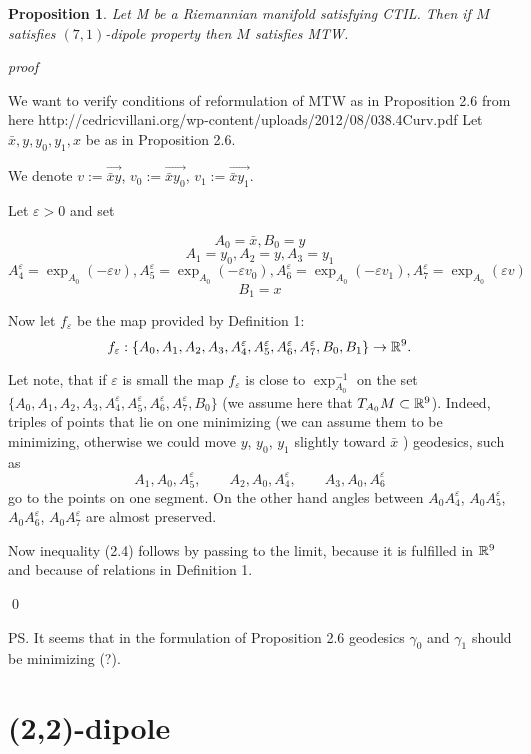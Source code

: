 \documentclass[a4paper,12pt]{article}
\newtheorem{proposition}[theorem]{Proposition}
\theoremstyle{definition}
\theoremstyle{definition}
\theoremstyle{definition}
\begin{document}
\begin{proposition}
Let
M
be a Riemannian manifold satisfying
CTIL. Then if $M$ satisfies 
$(7,1)$-dipole property then $M$ satisfies MTW. 

\end{proposition}

{\it proof}

We want to verify conditions of reformulation of MTW as in
Proposition 2.6 from here
 http://cedricvillani.org/wp-content/uploads/2012/08/038.4Curv.pdf
Let $\bar x, y, y_0, y_1, x$ be as in
Proposition 2.6.

We denote
$v:=\overrightarrow{\bar x y}$,  $v_0:=\overrightarrow{\bar x y_0}$,
$v_1:=\overrightarrow{\bar x y_1}$.

Let $\varepsilon>0$ and set

$$A_0=\bar{x}, B_0=y$$
$$A_1=y_0, A_2=y,  A_3=y_1$$ 
$$ A_4^{\varepsilon}=\exp_{A_0}(-\varepsilon v),
A_5^{\varepsilon}=\exp_{A_0}( -\varepsilon v_0),
A_6^{\varepsilon}=\exp_{A_0}(-\varepsilon v_1),
A_7^{\varepsilon}=\exp_{A_0}(\varepsilon v)$$
$$B_1=x$$

Now let $f_{\varepsilon}$ be 
 the map provided by Definition 1:
$$f_{\varepsilon}:\{A_0, A_1,A_2, A_3, A_4^{\varepsilon},
A_5^{\varepsilon}, A_6^{\varepsilon}, A_7^{\varepsilon}, B_0, B_1\}\to {\mathbb R}^9.$$

Let note, that if
 $\varepsilon$ is small the map
$f_\varepsilon$   is close to $\exp_{A_0}^{-1}$ on the set $\{A_0, A_1,A_2, A_3, A_4^{\varepsilon},
A_5^{\varepsilon}, A_6^{\varepsilon}, A_7^{\varepsilon}, B_0\}$
(we assume here that $T_{A_0}M\subset{\mathbb R}^9$).
Indeed, triples of points that lie on one minimizing (we  can assume them to be
 minimizing,
otherwise we could move $y$, $y_0$, $y_1$ slightly toward $\bar x$ ) geodesics, such
as $$A_1, A_0, A_5^\varepsilon, \qquad
A_2, A_0, A_4^\varepsilon,  \qquad A_3, A_0, A_6^\varepsilon$$
go to the points on one segment. 
On the other hand angles between $A_0 A_4^{\varepsilon}$,
$A_0A_5^{\varepsilon}$,
$A_0A_6^{\varepsilon}$,
$A_0A_7^{\varepsilon}$ are almost preserved.

Now inequality
(2.4)
follows by passing to the limit, because it is fulfilled in ${\mathbb R}^9$
and because of relations in Definition 1.

\qed\par\medskip

PS.  It seems that
in the formulation of Proposition 2.6 geodesics $\gamma_0$ and $\gamma_1$ 
should be minimizing (?).

\section{(2,2)-dipole}
\end{document}
